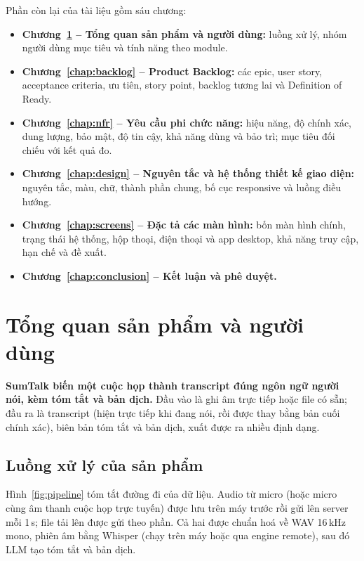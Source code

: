 \documentclass[12pt,a4paper]{report}
\begin{document}
Phần còn lại của tài liệu gồm sáu chương:
\begin{itemize}
  \item \textbf{Chương~\ref{chap:product} -- Tổng quan sản phẩm và người dùng:} luồng xử lý, nhóm người dùng
        mục tiêu và tính năng theo module.
  \item \textbf{Chương~\ref{chap:backlog} -- Product Backlog:} các epic, user story, acceptance criteria, ưu tiên,
        story point, backlog tương lai và Definition of Ready.
  \item \textbf{Chương~\ref{chap:nfr} -- Yêu cầu phi chức năng:} hiệu năng, độ chính xác, dung lượng, bảo mật,
        độ tin cậy, khả năng dùng và bảo trì; mục tiêu đối chiếu với kết quả đo.
  \item \textbf{Chương~\ref{chap:design} -- Nguyên tắc và hệ thống thiết kế giao diện:} nguyên tắc, màu, chữ,
        thành phần chung, bố cục responsive và luồng điều hướng.
  \item \textbf{Chương~\ref{chap:screens} -- Đặc tả các màn hình:} bốn màn hình chính, trạng thái hệ thống,
        hộp thoại, điện thoại và app desktop, khả năng truy cập, hạn chế và đề xuất.
  \item \textbf{Chương~\ref{chap:conclusion} -- Kết luận và phê duyệt.}
\end{itemize}

\chapter{Tổng quan sản phẩm và người dùng}
\label{chap:product}

\textbf{SumTalk biến một cuộc họp thành transcript đúng ngôn ngữ người nói, kèm tóm tắt và bản dịch.} Đầu vào
là ghi âm trực tiếp hoặc file có sẵn; đầu ra là transcript (hiện trực tiếp khi đang nói, rồi được thay bằng bản
cuối chính xác), biên bản tóm tắt và bản dịch, xuất được ra nhiều định dạng.

\section{Luồng xử lý của sản phẩm}

Hình~\ref{fig:pipeline} tóm tắt đường đi của dữ liệu. Audio từ micro (hoặc micro cùng âm thanh cuộc họp trực
tuyến) được lưu trên máy trước rồi gửi lên server mỗi 1\,s; file tải lên được gửi theo phần. Cả hai được chuẩn
hoá về WAV 16\,kHz mono, phiên âm bằng Whisper (chạy trên máy hoặc qua engine remote), sau đó LLM tạo tóm tắt và
bản dịch.
\end{document}
